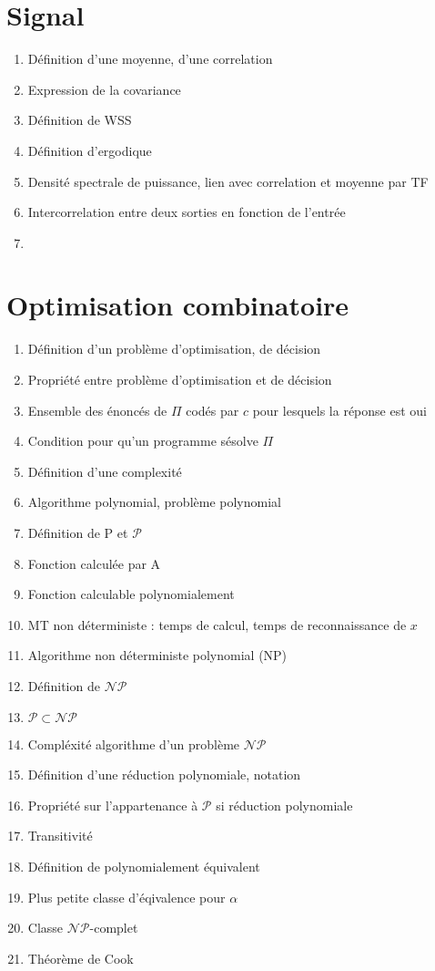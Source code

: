 \documentclass{article}
\begin{document}
\setcounter{tocdepth}{4}
\tableofcontents
\newpage

\part{Signal}
\begin{enumerate}
\item Définition d'une moyenne, d'une correlation
\item Expression de la covariance
\item Définition de WSS
\item Définition d'ergodique
\item Densité spectrale de puissance, lien avec correlation et moyenne par TF
\item Intercorrelation entre deux sorties en fonction de l'entrée
\item 
\end{enumerate}

\part{Optimisation combinatoire}
\begin{enumerate}
\item Définition d'un problème d'optimisation, de décision
\item Propriété entre problème d'optimisation et de décision
\item Ensemble des énoncés de $\Pi$ codés par $c$ pour lesquels la réponse est oui
\item Condition pour qu'un programme sésolve $\Pi$
\item Définition d'une complexité
\item Algorithme polynomial, problème polynomial
\item Définition de P et $\mathcal{P}$
\item Fonction calculée par A
\item Fonction calculable polynomialement
\item MT non déterministe : temps de calcul, temps de reconnaissance de $x$
\item Algorithme non déterministe polynomial (NP)
\item Définition de $\mathcal{N}\mathcal{P}$
\item $\mathcal{P}\subset\mathcal{N}\mathcal{P}$
\item Compléxité algorithme d'un problème $\mathcal{NP}$
\item Définition d'une réduction polynomiale, notation
\item Propriété sur l'appartenance à $\mathcal{P}$ si réduction polynomiale
\item Transitivité
\item Définition de polynomialement équivalent
\item Plus petite classe d'éqivalence pour $\alpha$
\item Classe $\mathcal{NP}$-complet
\item Théorème de Cook
\end{enumerate}
\end{document}
